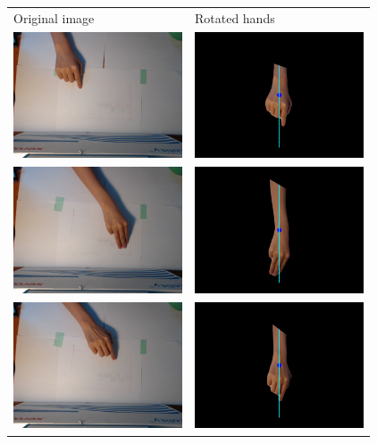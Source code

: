 \begin{tabular}{ll}
 Original image & Rotated hands \\
\includegraphics[width=5cm]{fig7/1-b.png} &
\includegraphics[width=5cm]{fig7/1-a.png} \\
\includegraphics[width=5cm]{fig7/2-b.png} &
\includegraphics[width=5cm]{fig7/2-a.png} \\
\includegraphics[width=5cm]{fig7/3-b.png} &
\includegraphics[width=5cm]{fig7/3-a.png} \\

\end{tabular}
